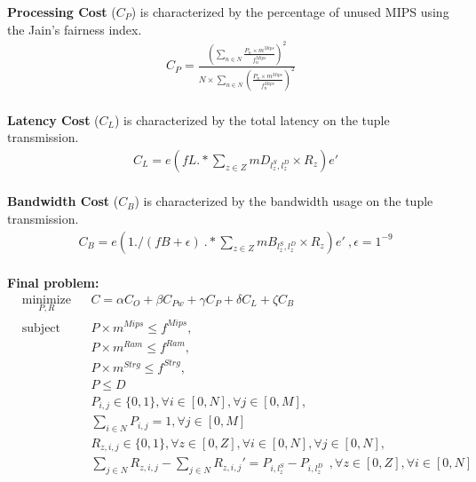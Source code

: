 \documentclass{article}
\begin{document}
\noindent\textbf{Processing Cost} ($C_P$) is characterized by the percentage of unused MIPS using the Jain's fairness index.\\[6pt]
\begin{equation*}
\begin{aligned}
C_P = \frac{\left(\sum_{n\in N} \frac{P_n \times m^{Mips}}{f_n^{Mips}}\right)^2}{N\times \sum_{n\in N} \left(\frac{P_n \times m^{Mips}}{f_n^{Mips}}\right)^2}
\end{aligned}
\end{equation*}\\[6pt]

\noindent\textbf{Latency Cost} ($C_L$) is characterized by the total latency on the tuple transmission.\\[6pt]
\begin{equation*}
\begin{aligned}
& C_L = e \left(fL .* \sum_{z\in Z} mD_{l^S_z,l^D_z} \times R_z\right) e'
\end{aligned}
\end{equation*}\\[6pt]

\noindent\textbf{Bandwidth Cost} ($C_B$) is characterized by the bandwidth usage on the tuple transmission.\\[6pt]
\begin{equation*}
\begin{split}
& C_B = e \left(1./(fB + \epsilon)~.* \sum_{z\in Z} mB_{l^S_z,l^D_z} \times R_z\right) e'~, \epsilon = 1^{-9}
\end{split}
\end{equation*}\\[6pt]
                      
\noindent\textbf{Final problem:}\\[6pt]
\begin{equation*}
\begin{aligned}
& \underset{P, R}{\text{minimize}}
& & C = \alpha C_O + \beta C_{Pw} + \gamma C_P  + \delta C_L + \zeta C_B\\
& \text{subject to}
& & P\times m^{Mips} \leq f^{Mips}, \\
&&& P\times m^{Ram} \leq f^{Ram}, \\
&&& P\times m^{Strg} \leq f^{Strg}, \\
&&& P\leq D\\
&&& P_{i,j} \in \{0, 1\}, \forall i \in [0, N], \forall j \in [0, M],\\
&&& \sum_{i \in N} P_{i,j} = 1, \forall j \in [0, M]\\
&&& R_{z, i,j} \in \{0, 1\}, \forall z \in [0, Z], \forall i \in [0, N], \forall j \in [0, N],\\
&&& \sum_{j\in N} R_{z, i, j} - \sum_{j\in N} R_{z, i, j}' = P_{i, l^S_z} - P_{i, l^D_z}~~, \forall z \in [0, Z], \forall i \in [0, N]
\end{aligned}
\end{equation*}
\end{document}
